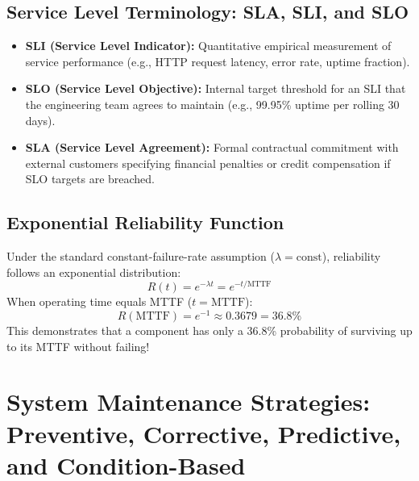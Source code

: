 \subsection{Service Level Terminology: SLA, SLI, and SLO}
\begin{itemize}
    \item \textbf{SLI (Service Level Indicator):} Quantitative empirical measurement of service performance (e.g., HTTP request latency, error rate, uptime fraction).
    \item \textbf{SLO (Service Level Objective):} Internal target threshold for an SLI that the engineering team agrees to maintain (e.g., 99.95\% uptime per rolling 30 days).
    \item \textbf{SLA (Service Level Agreement):} Formal contractual commitment with external customers specifying financial penalties or credit compensation if SLO targets are breached.
\end{itemize}

\subsection{Exponential Reliability Function}
Under the standard constant-failure-rate assumption ($\lambda = \text{const}$), reliability follows an exponential distribution:
\begin{equation}
\boxed{R(t) = e^{-\lambda t} = e^{-t / \text{MTTF}}}
\end{equation}
When operating time equals MTTF ($t = \text{MTTF}$):
\begin{equation}
R(\text{MTTF}) = e^{-1} \approx 0.3679 = \mathbf{36.8\%}
\end{equation}
This demonstrates that a component has only a 36.8\% probability of surviving up to its MTTF without failing!

\section{System Maintenance Strategies: Preventive, Corrective, Predictive, and Condition-Based}
\label{sec:os_maintenance}


